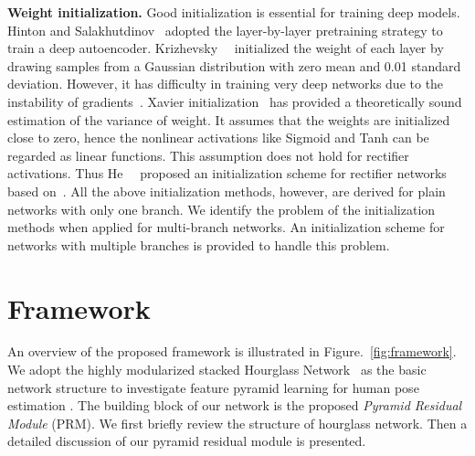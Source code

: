 \documentclass[10pt,twocolumn,letterpaper]{article}
\newcommand{\smalltitle}[1]{\vspace{0.2em}\noindent \textbf{{#1}}}
\begin{document}
																																				 

\smalltitle{Weight initialization. }
Good initialization is essential for training deep models. 
Hinton and Salakhutdinov~\cite{hinton2006reducing} adopted the layer-by-layer pretraining strategy to train a deep autoencoder. 
Krizhevsky~\etal~\cite{krizhevsky2012imagenet} initialized the weight of each layer by drawing samples from a Gaussian distribution with zero mean and 0.01 standard deviation. 
However, it has difficulty in training very deep networks due to the instability of gradients~\cite{simonyan2014very}. 
Xavier initialization~\cite{glorot2010understanding} has provided a theoretically sound estimation of the variance of weight. 
It assumes that the weights are initialized close to zero, hence the nonlinear activations like Sigmoid and Tanh can be regarded as linear functions. 
This assumption does not hold for rectifier~\cite{nair2010rectified} activations. 
Thus He~\etal~\cite{he2015delving} proposed an initialization scheme for rectifier networks based on~\cite{glorot2010understanding}. 
All the above initialization methods, however, are derived for plain networks with only one branch. We identify the problem of the initialization methods when applied for multi-branch networks. 
An initialization scheme for networks with multiple branches is provided to handle this problem. 



\section{Framework}


An overview of the proposed framework is illustrated in Figure.~\ref{fig:framework}. 
We adopt the highly modularized stacked Hourglass Network~\cite{newell2016stacked} as the basic network structure to investigate feature pyramid learning for human pose estimation . 
The building block of our network is the proposed \textit{Pyramid Residual Module} (PRM). 
We first briefly review the structure of hourglass network. 
Then a detailed discussion of our pyramid residual module is presented.
\end{document}
